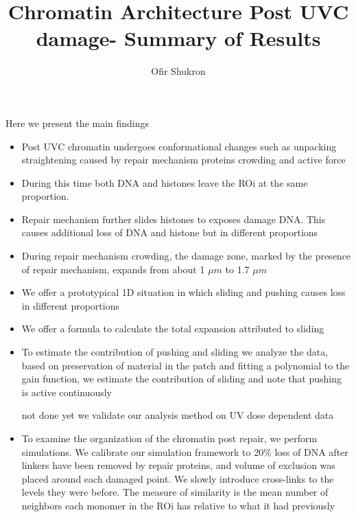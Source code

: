 \documentclass[12pt]{report}
\begin{document}
		\title{Chromatin Architecture Post UVC damage- Summary of Results}	
		\author{Ofir Shukron}	
		\maketitle
		Here we present the main findings 
		\begin{itemize}
			\item Post UVC chromatin undergoes conformational changes such as unpacking straightening caused by repair mechanism proteins crowding and active force
			\item During this time both DNA and histones leave the ROi at the same proportion. 
			\item Repair mechanism further slides histones to exposes damage DNA. This causes additional loss of DNA and histone but in different proportions 
			\item During repair mechanism crowding, the damage zone, marked by the presence of repair mechanism, expands from about 1 $\mu  m$ to 1.7 $\mu m$
			\item We offer a prototypical 1D situation in which sliding and pushing causes loss in different proportions 
			\item We offer a formula to calculate the total expansion attributed to sliding 
			\item To estimate the contribution of pushing and sliding we analyze the data, based on preservation of material in the patch and fitting a polynomial to the gain function, we estimate the contribution of sliding and note that pushing is active continuously 			
			\item [not done yet] we validate our analysis method on UV dose dependent data
			\item To examine the organization of the  chromatin post repair, we perform simulations. We calibrate our simulation framework to 20\% loss of DNA after linkers have been removed by repair proteins, and volume of exclusion was placed around each damaged point. We slowly introduce cross-links to the levels they were before. 
			The measure of similarity is the mean number of neighbors each monomer in the ROi has relative to what it had previously
			
		\end{itemize}
		
\end{document}
